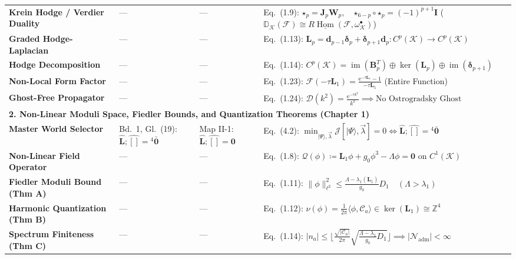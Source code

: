 \documentclass[
    12pt,
    a4paper,
    headings=normal,
    twoside=false,
    open=any,
    parskip=half
]{scrbook}
\DeclareMathOperator{\Hom}{Hom}
\newcommand{\eu}{\mathrm{e}}
\newcommand{\spectrumN}{\mathcal{N}_{\text{adm}}}
\begin{document}
\begin{longtable}{p{3.4cm}p{3.2cm}p{3.2cm}p{5.4cm}}
\textbf{Krein Hodge / Verdier Duality} & — & — & Eq.~(1.9): $\boldsymbol{\star}_p = \mathbf{J}_p \mathbf{W}_p, \quad \boldsymbol{\star}_{6-p} \circ \boldsymbol{\star}_p = (-1)^{p+1}\mathbf{I}$ ($\mathbb{D}_\mathcal{K}(\mathscr{F}) \cong R\underline{\Hom}(\mathscr{F}, \omega_\mathcal{K}^\bullet)$) \\
\textbf{Graded Hodge-Laplacian} & — & — & Eq.~(1.13): $\mathbf{L}_p = \mathbf{d}_{p-1}\boldsymbol{\delta}_p + \boldsymbol{\delta}_{p+1}\mathbf{d}_p \colon C^p(\mathcal{K}) \to C^p(\mathcal{K})$ \\
\textbf{Hodge Decomposition} & — & — & Eq.~(1.14): $C^p(\mathcal{K}) = \operatorname{im}(\mathbf{B}_p^T) \oplus \ker(\mathbf{L}_p) \oplus \operatorname{im}(\boldsymbol{\delta}_{p+1})$ \\
\textbf{Non-Local Form Factor} & — & — & Eq.~(1.23): $\mathcal{F}(-\tau \mathbf{L}_1) = \frac{\eu^{-\tau \mathbf{L}_1} - 1}{-\tau \mathbf{L}_1}$ (Entire Function) \\
\textbf{Ghost-Free Propagator} & — & — & Eq.~(1.24): $\mathcal{D}(k^2) = \frac{\eu^{-\tau k^2}}{k^2} \implies \text{No Ostrogradsky Ghost}$ \\\midrule
\multicolumn{4}{l}{\textsf{\textbf{\color{maincolor!90!black}2. Non-Linear Moduli Space, Fiedler Bounds, and Quantization Theorems (Chapter 1)}}} \\\midrule
\textbf{Master World Selector} & Bd.~1, Gl.~(19): $\hat{\mathbf{L}};\hat{[]} = {}^4\bar{\mathbf{0}}$ & Map II-1: $\hat{\mathbf{L}};\hat{[]} = \mathbf{0}$ & Eq.~(4.2): $\min_{|\Psi\rangle, \vec{\lambda}} \mathcal{J}[|\Psi\rangle, \vec{\lambda}] = 0 \iff \hat{\mathbf{L}};\hat{[]} = {}^4\bar{\mathbf{0}}$ \\
\textbf{Non-Linear Field Operator} & — & — & Eq.~(1.8): $\mathcal{Q}(\phi) \coloneqq \mathbf{L}_1\phi + g_0\phi^3 - \Lambda\phi = \mathbf{0}$ on $C^1(\mathcal{K})$ \\
\textbf{Fiedler Moduli Bound (Thm A)}& — & — & Eq.~(1.11): $\|\phi\|_{\ell^2}^2 \le \frac{\Lambda - \lambda_1(\mathbf{L}_1)}{g_0} D_1 \quad (\Lambda > \lambda_1)$ \\
\textbf{Harmonic Quantization (Thm B)}& — & — & Eq.~(1.12): $\nu(\phi) = \frac{1}{2\pi}\langle\phi, \mathcal{C}_a\rangle \in \ker(\mathbf{L}_1) \cong \mathbb{Z}^4$ \\
\textbf{Spectrum Finiteness (Thm C)} & — & — & Eq.~(1.14): $|n_a| \le \lfloor \frac{\sqrt{|\mathcal{C}_a|}}{2\pi}\sqrt{\frac{\Lambda - \lambda_1}{g_0}D_1} \rfloor \implies |\spectrumN| < \infty$ \\

\end{longtable}
\end{document}
